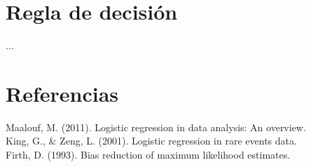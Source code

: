 \documentclass[12pt]{report}
\begin{document}
\chapter{Regla de decisi\'on}
...

\chapter*{Referencias}
Maalouf, M. (2011). Logistic regression in data analysis: An overview. \\ 
King, G., & Zeng, L. (2001). Logistic regression in rare events data. \\ 
Firth, D. (1993). Bias reduction of maximum likelihood estimates.
\end{document}
